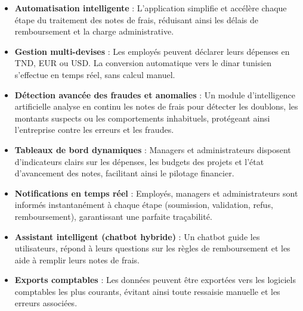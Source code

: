 \documentclass[12pt,a4paper]{report}
\begin{document}
\begin{itemize}

 \item \textbf{Automatisation intelligente} : L'application simplifie et accélère chaque étape du traitement des notes de frais, réduisant ainsi les délais de remboursement et la charge administrative.

 

 \item \textbf{Gestion multi-devises} : Les employés peuvent déclarer leurs dépenses en TND, EUR ou USD. La conversion automatique vers le dinar tunisien s'effectue en temps réel, sans calcul manuel.

 

 \item \textbf{Détection avancée des fraudes et anomalies} : Un module d'intelligence artificielle analyse en continu les notes de frais pour détecter les doublons, les montants suspects ou les comportements inhabituels, protégeant ainsi l'entreprise contre les erreurs et les fraudes.

 

 \item \textbf{Tableaux de bord dynamiques} : Managers et administrateurs disposent d'indicateurs clairs sur les dépenses, les budgets des projets et l'état d'avancement des notes, facilitant ainsi le pilotage financier.

 

 \item \textbf{Notifications en temps réel} : Employés, managers et administrateurs sont informés instantanément à chaque étape (soumission, validation, refus, remboursement), garantissant une parfaite traçabilité.

 

 \item \textbf{Assistant intelligent (chatbot hybride)} : Un chatbot guide les utilisateurs, répond à leurs questions sur les règles de remboursement et les aide à remplir leurs notes de frais.

 

 \item \textbf{Exports comptables} : Les données peuvent être exportées vers les logiciels comptables les plus courants, évitant ainsi toute ressaisie manuelle et les erreurs associées.

 

 

\end{itemize}
\end{document}
